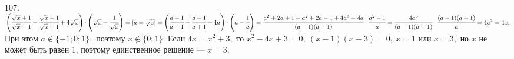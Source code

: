 107. $\left(\cfrac{\sqrt{x}+1}{\sqrt{x}-1}-\cfrac{\sqrt{x}-1}{\sqrt{x}+1}+4\sqrt{x}\right)\cdot\left(\sqrt{x}-\cfrac{1}{\sqrt{x}}\right)=[a=\sqrt{x}]=
\left(\cfrac{a+1}{a-1}-\cfrac{a-1}{a+1}+4a\right)\cdot\left(a-\cfrac{1}{a}\right)=
\cfrac{a^2+2a+1-a^2+2a-1+4a^3-4a}{(a-1)(a+1)}\cdot\cfrac{a^2-1}{a}=
\cfrac{4a^3}{(a-1)(a+1)}\cdot\cfrac{(a-1)(a+1)}{a}=4a^2=4x.$ При этом $a\notin\{-1;0;1\},$ поэтому $x\notin\{0;1\}.$ Если $4x=x^2+3,$ то $x^2-4x+3=0,\ (x-1)(x-3)=0,\ x=1$ или $x=3,$ но $x$ не может быть равен 1, поэтому единственное решение --- $x=3.$\\
